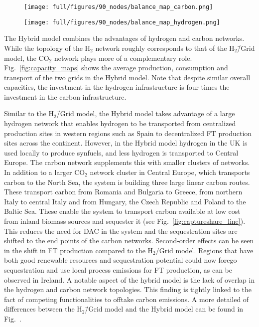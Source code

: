 \documentclass[twocolumn]{article}
\newcommand{\COtwo}{CO$_2$}
\newcommand{\Htwo}{H$_2$}
\newcommand{\modH}{H$_2$\=/Grid model}
\newcommand{\modHybrid}{Hybrid model}
\begin{document}
\begin{figure*}[ht!]
    \centering
    \begin{subfigure}{.49\textwidth}
        \centering
        \texttt{[image: full/figures/90\_nodes/balance\_map\_carbon.png]}
        \label{fig:capacity_map_carbon_co2}
    \end{subfigure}%
    \begin{subfigure}{.49\textwidth}
        \centering
        \texttt{[image: full/figures/90\_nodes/balance\_map\_hydrogen.png]}
        \label{fig:capacity_map_hydrogen_co2}
    \end{subfigure}
    \caption{Optimal production and transport capacities of the carbon and hydrogen sector in a net-zero energy system in Europe with both \COtwo{} and \Htwo{} network expansion (Hybrid).
    }
    \label{fig:capacity_maps}
\end{figure*}

The \modHybrid{} combines the advantages of hydrogen and carbon networks. While the topology of the \Htwo{} network roughly corresponds to that of the \modH{}, the \COtwo{} network plays more of a complementary role. Fig.~\ref{fig:capacity_maps} shows the average production, consumption and transport of the two grids in the \modHybrid{}. Note that despite similar overall capacities, the investment in the hydrogen infrastructure is four times the investment in the carbon infrastructure.


Similar to the \modH{}, the \modHybrid{} takes advantage of a large hydrogen network that enables hydrogen to be transported from centralized production sites in western regions such as Spain to decentralized FT production sites across the continent. However, in the \modHybrid{} hydrogen in the UK is used locally to produce synfuels, and less hydrogen is transported to Central Europe.
The carbon network supplements this with smaller clusters of networks. In addition to a larger \COtwo{} network cluster in Central Europe, which transports carbon to the North Sea, the system is building three large linear carbon routes. These transport carbon from Romania and Bulgaria to Greece, from northern Italy to central Italy and from Hungary, the Czech Republic and Poland to the Baltic Sea. These enable the system to transport carbon available at low cost from inland biomass sources and sequester it (see Fig.~\ref{fig:captureshare_line}). This reduces the need for DAC in the system and the sequestration sites are shifted to the end points of the carbon networks. Second-order effects can be seen in the shift in FT production compared to the \modH{}. Regions that have both good renewable resources and sequestration potential could now forego sequestration and use local process emissions for FT production, as can be observed in Ireland. A notable aspect of the hybrid model is the lack of overlap in the hydrogen and carbon network topologies. This finding is tightly linked to the fact of competing functionalities to offtake carbon emissions.
A more detailed of differences between the \modH{} and the \modHybrid{} can be found in Fig.~.
\end{document}
